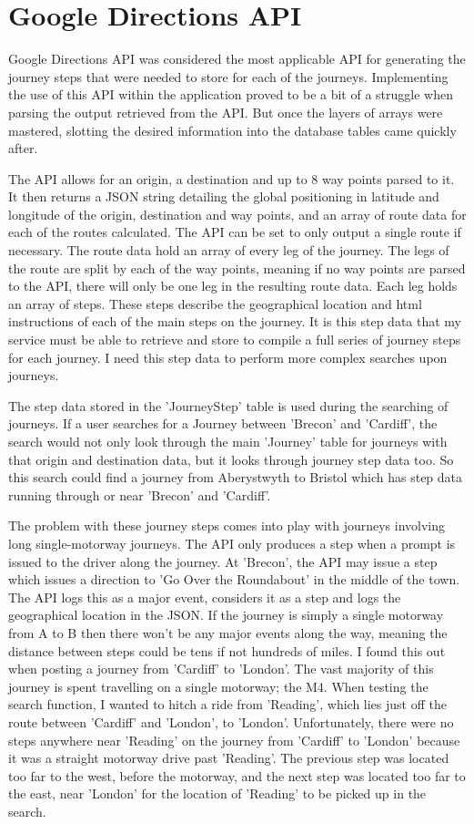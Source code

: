 \section{Google Directions API}
	Google Directions API was considered the most applicable API for generating the journey steps that were needed to store for each of the journeys. Implementing the use of this API within the application proved to be a bit of a struggle when parsing the output retrieved from the API. But once the layers of arrays were mastered, slotting the desired information into the database tables came quickly after. 
	
	The API allows for an origin, a destination and up to 8 way points parsed to it. It then returns a JSON string detailing the global positioning in latitude and longitude of the origin, destination and way points, and an array of route data for each of the routes calculated. The API can be set to only output a single route if necessary. The route data hold an array of every leg of the journey. The legs of the route are split by each of the way points, meaning if no way points are parsed to the API, there will only be one leg in the resulting route data. Each leg holds an array of steps. These steps describe the geographical location and html instructions of each of the main steps on the journey. It is this step data that my service must be able to retrieve and store to compile a full series of journey steps for each journey. I need this step data to perform more complex searches upon journeys.
	
	The step data stored in the 'Journey\textunderscore Step' table is used during the searching of journeys. If a user searches for a Journey between 'Brecon' and 'Cardiff', the search would not only look through the main 'Journey' table for journeys with that origin and destination data, but it looks through journey step data too. So this search could find a journey from Aberystwyth to Bristol which has step data running through or near 'Brecon' and 'Cardiff'. 
	
	The problem with these journey steps comes into play with journeys involving long single-motorway journeys. The API only produces a step when a prompt is issued to the driver along the journey. At 'Brecon', the API may issue a step which issues a direction to 'Go Over the Roundabout' in the middle of the town. The API logs this as a major event, considers it as a step and logs the geographical location in the JSON. If the journey is simply a single motorway from A to B then there won't be any major events along the way, meaning the distance between steps could be tens if not hundreds of miles. I found this out when posting a journey from 'Cardiff' to 'London'. The vast majority of this journey is spent travelling on a single motorway; the M4. When testing the search function, I wanted to hitch a ride from 'Reading', which lies just off the route between 'Cardiff' and 'London', to 'London'. Unfortunately, there were no steps anywhere near 'Reading' on the journey from 'Cardiff' to 'London' because it was a straight motorway drive past 'Reading'. The previous step was located too far to the west, before the motorway, and the next step was located too far to the east, near 'London' for the location of 'Reading' to be picked up in the search.
	
